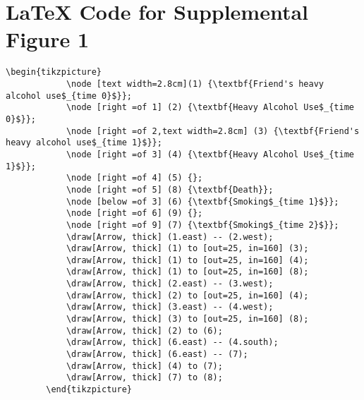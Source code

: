 \documentclass{article}
\begin{document}
\section*{\LaTeX\hspace*{1mm} Code for Supplemental Figure 1}
    \begin{lstlisting}[frame=single, basicstyle=\ttfamily, linewidth=22.5cm]
        \begin{tikzpicture}
            \node [text width=2.8cm](1) {\textbf{Friend's heavy alcohol use$_{time 0}$}};
            \node [right =of 1] (2) {\textbf{Heavy Alcohol Use$_{time 0}$}};
            \node [right =of 2,text width=2.8cm] (3) {\textbf{Friend's heavy alcohol use$_{time 1}$}};
            \node [right =of 3] (4) {\textbf{Heavy Alcohol Use$_{time 1}$}};
            \node [right =of 4] (5) {};
            \node [right =of 5] (8) {\textbf{Death}};
            \node [below =of 3] (6) {\textbf{Smoking$_{time 1}$}};
            \node [right =of 6] (9) {};
            \node [right =of 9] (7) {\textbf{Smoking$_{time 2}$}};
            \draw[Arrow, thick] (1.east) -- (2.west);
            \draw[Arrow, thick] (1) to [out=25, in=160] (3);
            \draw[Arrow, thick] (1) to [out=25, in=160] (4);
            \draw[Arrow, thick] (1) to [out=25, in=160] (8);
            \draw[Arrow, thick] (2.east) -- (3.west);
            \draw[Arrow, thick] (2) to [out=25, in=160] (4);
            \draw[Arrow, thick] (3.east) -- (4.west);
            \draw[Arrow, thick] (3) to [out=25, in=160] (8);
            \draw[Arrow, thick] (2) to (6);
            \draw[Arrow, thick] (6.east) -- (4.south);
            \draw[Arrow, thick] (6.east) -- (7);
            \draw[Arrow, thick] (4) to (7);
            \draw[Arrow, thick] (7) to (8);
        \end{tikzpicture}
        \end{lstlisting}
\end{document}

